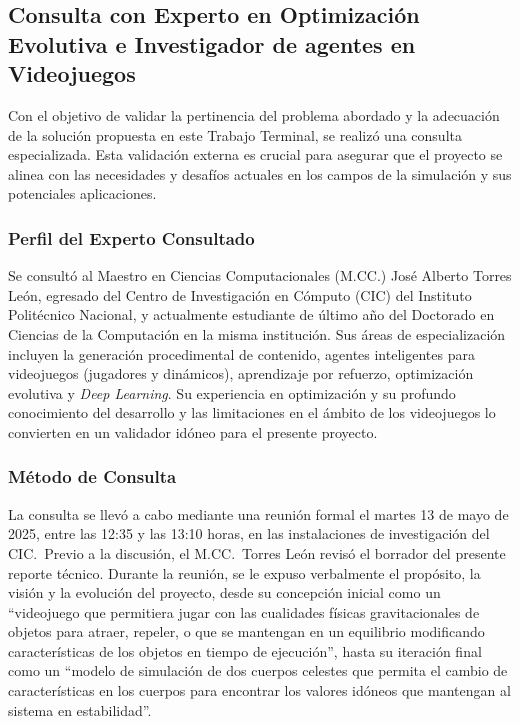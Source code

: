 \subsection[Consulta con experto núm. 01]{Consulta con Experto en Optimización Evolutiva e Investigador de agentes en Videojuegos}%
\label{subsec:validacion-experto}

Con el objetivo de validar la pertinencia del problema abordado y la adecuación de la solución propuesta en este Trabajo Terminal, se realizó una consulta especializada. Esta validación externa es crucial para asegurar que el proyecto se alinea con las necesidades y desafíos actuales en los campos de la simulación y sus potenciales aplicaciones.

\subsubsection{Perfil del Experto Consultado}

Se consultó al Maestro en Ciencias Computacionales (M.CC.) José Alberto Torres León, egresado del Centro de Investigación en Cómputo (CIC) del Instituto Politécnico Nacional, y actualmente estudiante de último año del Doctorado en Ciencias de la Computación en la misma institución. Sus áreas de especialización incluyen la generación procedimental de contenido, agentes inteligentes para videojuegos (jugadores y dinámicos), aprendizaje por refuerzo, optimización evolutiva y \textit{Deep Learning}. Su experiencia en optimización y su profundo conocimiento del desarrollo y las limitaciones en el ámbito de los videojuegos lo convierten en un validador idóneo para el presente proyecto.

\subsubsection{Método de Consulta}

La consulta se llevó a cabo mediante una reunión formal el martes 13 de mayo de 2025, entre las 12:35 y las 13:10 horas, en las instalaciones de investigación del CIC.\ Previo a la discusión, el M.CC.\ Torres León revisó el borrador del presente reporte técnico. Durante la reunión, se le expuso verbalmente el propósito, la visión y la evolución del proyecto, desde su concepción inicial como un ``videojuego que permitiera jugar con las cualidades físicas gravitacionales de objetos para atraer, repeler, o que se mantengan en un equilibrio modificando características de los objetos en tiempo de ejecución'', hasta su iteración final como un ``modelo de simulación de dos cuerpos celestes que permita el cambio de características en los cuerpos para encontrar los valores idóneos que mantengan al sistema en estabilidad''.

